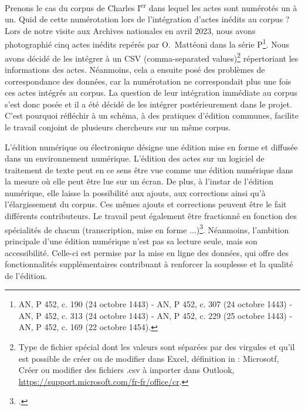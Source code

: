 \par Prenons le cas du corpus de Charles I\textsuperscript{er} dans lequel les actes sont numérotés un à un. Quid de cette numérotation lors de l'intégration d'actes inédits au corpus ? Lors de notre visite aux Archives nationales en avril 2023, nous avons photographié cinq actes inédits repérés par O.~Mattéoni dans la série P\footnote{AN, P 452, c. 190 (24 octobre 1443) - AN, P 452, c. 307 (24 octobre 1443) - AN, P 452, c. 313 (24 octobre 1443) - AN, P 452, c. 229 (25 octobre 1443) - AN, P 452, c. 169 (22 octobre 1454).}. Nous avons décidé de les intégrer à un CSV (comma-separated values)\footnote{Type de fichier spécial dont les valeurs sont séparées par des virgules et qu’il est possible de créer ou de modifier dans Excel, définition in : Microsotf, \og Créer ou modifier des fichiers .csv à importer dans Outlook\fg, \url{https://support.microsoft.com/fr-fr/office/cr}.} répertoriant les informations des actes. Néanmoins, cela a ensuite posé des problèmes de correspondance des données, car la numérotation ne correspondait plus une fois ces actes intégrés au corpus. La question de leur intégration immédiate au corpus s'est donc posée et il a été décidé de les intégrer postérieurement dans le projet. C'est pourquoi réfléchir à un schéma, à des pratiques d'édition communes, facilite le travail conjoint de plusieurs chercheurs sur un même corpus. 
\newline 

\par L'édition numérique ou électronique désigne une édition mise en forme et diffusée dans un environnement numérique. L'édition des actes sur un logiciel de traitement de texte peut en ce sens être vue comme une édition numérique dans la mesure où elle peut être lue sur un écran. De plus, à l'instar de l'édition numérique, elle laisse la possibilité aux ajouts, aux corrections ainsi qu'à l'élargissement du corpus. Ces mêmes ajouts et corrections peuvent être le fait différents contributeurs. Le travail peut également être fractionné en fonction des spécialités de chacun (transcription, mise en forme ...)\footnote{\cite{apollonEditionCritiqueEre2017}.}. Néanmoins, l'ambition principale d'une édition numérique n'est pas sa lecture seule, mais son accessibilité. Celle-ci est permise par la mise en ligne des données, qui offre des fonctionnalités supplémentaires contribuant à renforcer la souplesse et la qualité de l'édition.
\newline 

